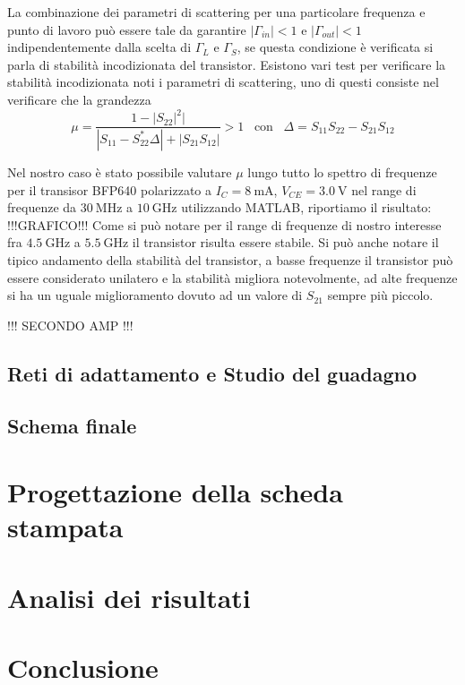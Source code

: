 \documentclass[12pt]{article}
\begin{document}
La combinazione dei parametri di scattering per una particolare frequenza e punto di lavoro può essere tale da garantire $\left|\Gamma_{in}\right| < 1$ e $\left|\Gamma_{out}\right| < 1$ indipendentemente dalla scelta di $\Gamma_{L}$ e $\Gamma_{S}$, se questa condizione è verificata si parla di stabilità incodizionata del transistor. Esistono vari test per verificare la stabilità incodizionata noti i parametri di scattering, uno di questi consiste nel verificare che la grandezza
\begin{equation}
    \mu = \dfrac{1-\left|S_{22}\right|^2|}{\left|S_{11}-S_{22}^{*}\Delta\right|+\left|S_{21}S_{12}\right|}> 1 \hspace{10pt} \text{con} \hspace{10pt} \Delta=S_{11}S_{22}-S_{21}S_{12}
\end{equation}

Nel nostro caso è stato possibile valutare $\mu$ lungo tutto lo spettro di frequenze per il transisor BFP640 polarizzato a $I_{C}=\SI{8}{\milli\ampere}$, $V_{CE}=\SI{3.0}{\volt}$ nel range di frequenze da $\SI{30}{\mega\hertz}$ a $\SI{10}{\giga\hertz}$ utilizzando MATLAB, riportiamo il risultato:
!!!GRAFICO!!!
Come si può notare per il range di frequenze di nostro interesse fra $\SI{4.5}{\giga\hertz}$ a $\SI{5.5}{\giga\hertz}$ il transistor risulta essere stabile. Si può anche notare il tipico andamento della stabilità del transistor, a basse frequenze il transistor può essere considerato unilatero e la stabilità migliora notevolmente, ad alte frequenze si ha un uguale miglioramento dovuto ad un valore di $S_{21}$ sempre più piccolo.

!!! SECONDO AMP !!!

\subsection{Reti di adattamento e Studio del guadagno}

\subsection{Schema finale}

\section{Progettazione della scheda stampata}
\section{Analisi dei risultati}


\section{Conclusione}
\end{document}
